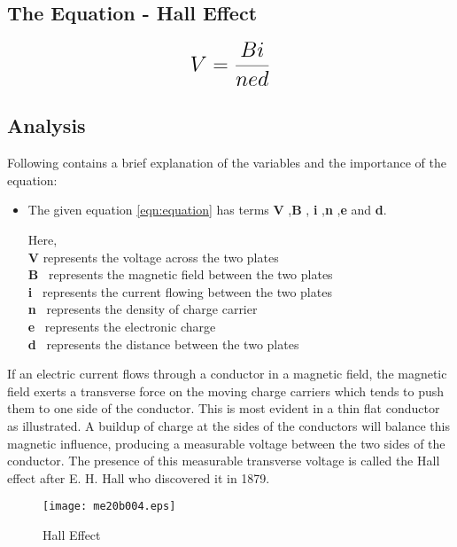 \subsection{The Equation - Hall Effect}

\begin{equation}
 {\LARGE{\textbf{$V =\frac{Bi}{{ned}}$}}}
 \label{eqn:equation}
\end{equation}


\subsection{Analysis}
Following contains a brief explanation of the variables and the importance of the equation:
\begin{itemize}
\item {\normalsize {The given equation \ref{eqn:equation} has terms \textbf{V} ,\textbf{B} , \textbf{i} ,\textbf{n} ,\textbf{e} and  \textbf{d}.}}

{ Here,}\\
{\textbf{V} represents the voltage across the two plates }\\
{\textbf{B} \  represents the magnetic field between the two plates}\\
{\textbf{i} \  represents the current flowing between the two plates}\\
{\textbf{n} \  represents the density of charge carrier}\\
{\textbf{e} \ represents the electronic charge}\\
{\textbf{d} \ represents the distance between the two plates}
\end{itemize}

If an electric current flows through a conductor in a magnetic field, the magnetic field exerts a transverse force on the moving charge carriers which tends to push them to one side of the conductor. This is most evident in a thin flat conductor as illustrated. A buildup of charge at the sides of the conductors will balance this magnetic influence, producing a measurable voltage between the two sides of the conductor. The presence of this measurable transverse voltage is called the Hall effect after E. H. Hall who discovered it in 1879. \cite{weblink1}

\begin{figure}[h]
	{\begin{center}
		\texttt{[image: me20b004.eps]}
	\end{center}}
	\caption{Hall Effect \cite{pic}}
	\label{f1:image}
\end{figure}


